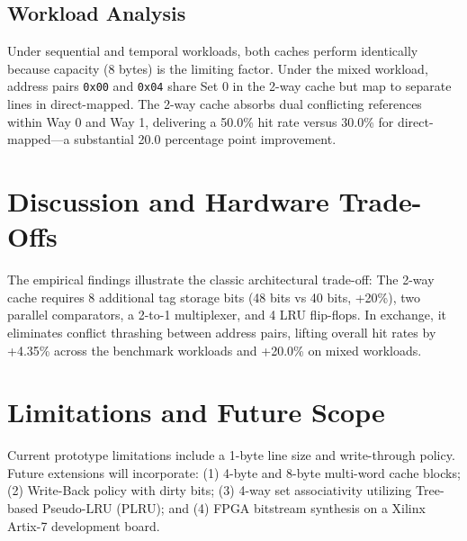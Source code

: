 \documentclass[10pt,twocolumn]{article}
\begin{document}
\subsection{Workload Analysis}
Under sequential and temporal workloads, both caches perform identically because capacity (8 bytes) is the limiting factor. Under the mixed workload, address pairs \texttt{0x00} and \texttt{0x04} share Set 0 in the 2-way cache but map to separate lines in direct-mapped. The 2-way cache absorbs dual conflicting references within Way 0 and Way 1, delivering a 50.0\% hit rate versus 30.0\% for direct-mapped---a substantial 20.0 percentage point improvement.

\section{Discussion and Hardware Trade-Offs}
The empirical findings illustrate the classic architectural trade-off: The 2-way cache requires 8 additional tag storage bits (48 bits vs 40 bits, +20\%), two parallel comparators, a 2-to-1 multiplexer, and 4 LRU flip-flops. In exchange, it eliminates conflict thrashing between address pairs, lifting overall hit rates by +4.35\% across the benchmark workloads and +20.0\% on mixed workloads.

\section{Limitations and Future Scope}
Current prototype limitations include a 1-byte line size and write-through policy. Future extensions will incorporate: (1) 4-byte and 8-byte multi-word cache blocks; (2) Write-Back policy with dirty bits; (3) 4-way set associativity utilizing Tree-based Pseudo-LRU (PLRU); and (4) FPGA bitstream synthesis on a Xilinx Artix-7 development board.
\end{document}
